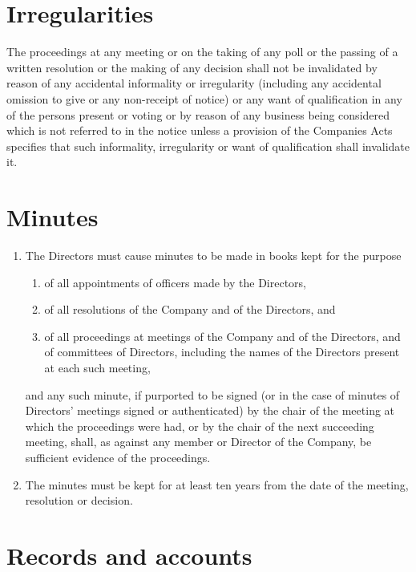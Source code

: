 \documentclass[a4paper,12pt]{article}
\begin{document}
\section{Irregularities}

The proceedings at any meeting or on the taking of any poll or the passing of a written resolution or the making of any decision shall not be invalidated by reason of any accidental informality or irregularity (including any accidental omission to give or any non-receipt of notice) or any want of qualification in any of the persons present or voting or by reason of any business being considered which is not referred to in the notice unless a provision of the Companies Acts specifies that such informality, irregularity or want of qualification shall invalidate it.

\section{Minutes}

\begin{enumerate}
  \item The Directors must cause minutes to be made in books kept for the purpose
  \begin{enumerate}
    \item of all appointments of officers made by the Directors,
    \item of all resolutions of the Company and of the Directors, and
    \item of all proceedings at meetings of the Company and of the Directors, and of committees of Directors, including the names of the Directors present at each such meeting,
  \end{enumerate}
  and any such minute, if purported to be signed (or in the case of minutes of Directors' meetings signed or authenticated) by the chair of the meeting at which the proceedings were had, or by the chair of the next succeeding meeting, shall, as against any member or Director of the Company, be sufficient evidence of the proceedings.
  \item The minutes must be kept for at least ten years from the date of the meeting, resolution or decision.
\end{enumerate}

\section{Records and accounts}
\end{document}
